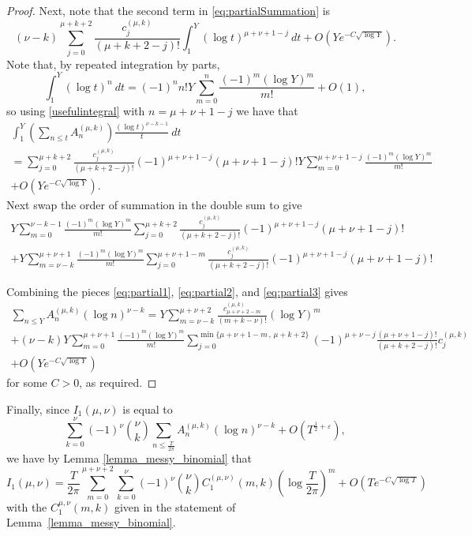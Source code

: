 \documentclass[12pt, a4paper,reqno]{amsart}
\theoremstyle{definition}
\numberwithin{equation}{section}
\begin{document}
\begin{proof}
Next, note that the second term in \eqref{eq:partialSummation} is
\begin{equation}\label{eq:partial2}
(\nu-k)\sum_{j=0}^{\mu+k+2}\frac{c^{(\mu,k)}_{j}}{(\mu+k+2-j)!}\int_1^Y(\log t)^{\mu+\nu+1-j}\ dt +O\left(Ye^{-C\sqrt{\log Y}}\right).
\end{equation}
Note that, by repeated integration by parts,
\begin{equation}\label{usefulintegral}
    \int_1^Y (\log t)^n\ dt = (-1)^n n! Y \sum_{m=0}^n \frac{(-1)^m (\log Y)^m}{m!} + O(1),
\end{equation}
so using \eqref{usefulintegral} with $n=\mu+\nu+1-j$ we have that  
\begin{multline*}
   \int_1^Y \left( \sum_{n\le t} A_n^{(\mu,k)} \right) \frac{(\log t)^{\nu-k-1}}{t} \ dt \\
   = \sum_{j=0}^{\mu+k+2}\frac{c^{(\mu,k)}_{j}}{(\mu+k+2-j)!}(-1)^{\mu+\nu+1-j}(\mu+\nu+1-j)!Y\sum_{m=0}^{\mu+\nu+1-j}\frac{(-1)^m(\log Y)^m}{m!}\\
    +O\left(Ye^{-C\sqrt{\log Y}}\right).
\end{multline*}
Next swap the order of summation in the double sum to give
\begin{multline}\label{eq:partial3}
   Y \sum_{m=0}^{\nu-k-1}  \frac{(-1)^m(\log Y)^m}{m!}  \sum_{j=0}^{\mu+k+2}  \frac{c^{(\mu,k)}_{j}}{(\mu+k+2-j)!}(-1)^{\mu+\nu+1-j}(\mu+\nu+1-j)!\\
   +Y \sum_{m=\nu-k}^{\mu+\nu+1}  \frac{(-1)^m(\log Y)^m}{m!} \sum_{j=0}^{\mu+\nu+1-m}  \frac{c^{(\mu,k)}_{j}}{(\mu+k+2-j)!}(-1)^{\mu+\nu+1-j}(\mu+\nu+1-j)!
\end{multline}

Combining the pieces \eqref{eq:partial1}, \eqref{eq:partial2}, and \eqref{eq:partial3} gives
\begin{multline}\label{partial_sum_A}
\sum_{n\le Y}A_n^{(\mu,k)}(\log n)^{\nu-k}= Y\sum_{m=\nu-k}^{\mu+\nu+2} \frac{c^{(\mu,k)}_{\mu+\nu+2-m}}{(m+k-\nu)!}(\log Y)^{m} \\
+(\nu-k) Y \sum_{m=0}^{\mu+\nu+1}  \frac{(-1)^m(\log Y)^m}{m!}  \sum_{j=0}^{\min\{\mu+\nu+1-m \, , \, \mu+k+2\}} (-1)^{\mu+\nu-j} \frac{(\mu+\nu+1-j)!}{(\mu+k+2-j)!} c^{(\mu,k)}_{j}\\
+O\left(Ye^{-C\sqrt{\log Y}}\right)
\end{multline}
for some $C>0$, as required.
\end{proof}



Finally, since $I_1(\mu,\nu)$ is equal to 
\begin{equation*}
    \sum_{k=0}^{\nu} (-1)^{\nu} \binom{\nu}{k} \sum_{n\le\frac{T}{2\pi}}A_n^{(\mu,k)}(\log n)^{\nu-k}+O\left(T^{\frac{1}{2}+\varepsilon}\right),
\end{equation*}
we have by Lemma \ref{lemma_messy_binomial} that
\begin{equation}\label{I1poly_simplified}
    I_1(\mu,\nu)=\frac{T}{2\pi} \sum_{m=0}^{\mu+\nu+2} \sum_{k=0}^{\nu} (-1)^{\nu} \binom{\nu}{k}  C_1^{(\mu,\nu)}(m,k) \left(\log\frac{T}{2\pi}\right)^m+O\left(Te^{-C\sqrt{\log T}}\right)
\end{equation}
with the $C_1^{\mu,\nu}(m,k)$ given in the statement of Lemma~\ref{lemma_messy_binomial}.
\end{document}
